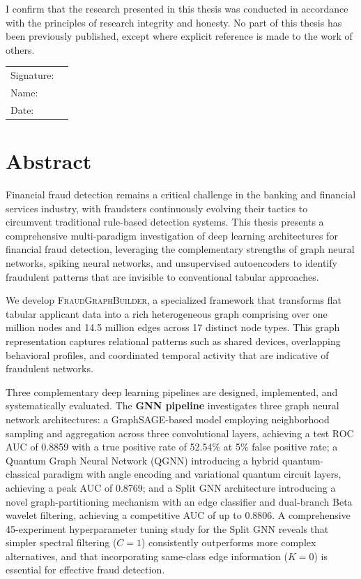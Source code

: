 I confirm that the research presented in this thesis was conducted in accordance with the principles of research integrity and honesty. No part of this thesis has been previously published, except where explicit reference is made to the work of others.

\vspace{2cm}
\noindent
\begin{tabular}{ll}
Signature: & \underline{\hspace{6cm}} \\[12pt]
Name: & \\[12pt]
Date: & \\
\end{tabular}

\chapter*{Abstract}

Financial fraud detection remains a critical challenge in the banking and financial services industry, with fraudsters continuously evolving their tactics to circumvent traditional rule-based detection systems. This thesis presents a comprehensive multi-paradigm investigation of deep learning architectures for financial fraud detection, leveraging the complementary strengths of graph neural networks, spiking neural networks, and unsupervised autoencoders to identify fraudulent patterns that are invisible to conventional tabular approaches.

We develop \textsc{FraudGraphBuilder}, a specialized framework that transforms flat tabular applicant data into a rich heterogeneous graph comprising over one million nodes and 14.5 million edges across 17 distinct node types. This graph representation captures relational patterns such as shared devices, overlapping behavioral profiles, and coordinated temporal activity that are indicative of fraudulent networks.

Three complementary deep learning pipelines are designed, implemented, and systematically evaluated. The \textbf{GNN pipeline} investigates three graph neural network architectures: a GraphSAGE-based model employing neighborhood sampling and aggregation across three convolutional layers, achieving a test ROC AUC of 0.8859 with a true positive rate of 52.54\% at 5\% false positive rate; a Quantum Graph Neural Network (QGNN) introducing a hybrid quantum-classical paradigm with angle encoding and variational quantum circuit layers, achieving a peak AUC of 0.8769; and a Split GNN architecture introducing a novel graph-partitioning mechanism with an edge classifier and dual-branch Beta wavelet filtering, achieving a competitive AUC of up to 0.8806. A comprehensive 45-experiment hyperparameter tuning study for the Split GNN reveals that simpler spectral filtering ($C=1$) consistently outperforms more complex alternatives, and that incorporating same-class edge information ($K=0$) is essential for effective fraud detection.

